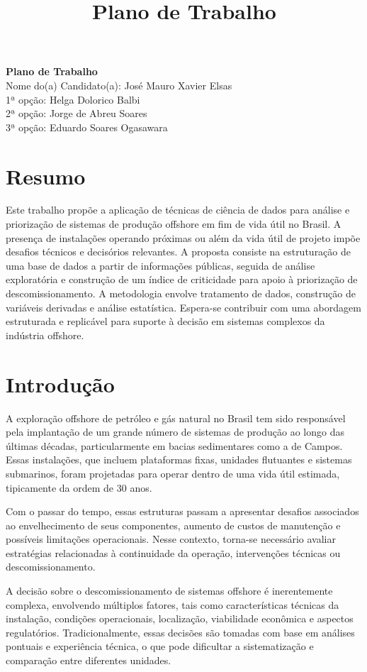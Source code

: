 \documentclass[a4paper,12pt]{article}
\title{Plano de Trabalho}
\author{}
\date{}
\begin{document}
\begin{center}
{\Large \textbf{Plano de Trabalho}}\\[1em]
Nome do(a) Candidato(a): José Mauro Xavier Elsas\\
1ª opção: Helga Dolorico Balbi\\
2ª opção: Jorge de Abreu Soares\\
3ª opção: Eduardo Soares Ogasawara
\end{center}

\section*{Resumo}

Este trabalho propõe a aplicação de técnicas de ciência de dados para análise e priorização de sistemas de produção offshore em fim de vida útil no Brasil. A presença de instalações operando próximas ou além da vida útil de projeto impõe desafios técnicos e decisórios relevantes. A proposta consiste na estruturação de uma base de dados a partir de informações públicas, seguida de análise exploratória e construção de um índice de criticidade para apoio à priorização de descomissionamento. A metodologia envolve tratamento de dados, construção de variáveis derivadas e análise estatística. Espera-se contribuir com uma abordagem estruturada e replicável para suporte à decisão em sistemas complexos da indústria offshore.

\section{Introdução}

A exploração offshore de petróleo e gás natural no Brasil tem sido responsável pela implantação de um grande número de sistemas de produção ao longo das últimas décadas, particularmente em bacias sedimentares como a de Campos. Essas instalações, que incluem plataformas fixas, unidades flutuantes e sistemas submarinos, foram projetadas para operar dentro de uma vida útil estimada, tipicamente da ordem de 30 anos.

Com o passar do tempo, essas estruturas passam a apresentar desafios associados ao envelhecimento de seus componentes, aumento de custos de manutenção e possíveis limitações operacionais. Nesse contexto, torna-se necessário avaliar estratégias relacionadas à continuidade da operação, intervenções técnicas ou descomissionamento.

A decisão sobre o descomissionamento de sistemas offshore é inerentemente complexa, envolvendo múltiplos fatores, tais como características técnicas da instalação, condições operacionais, localização, viabilidade econômica e aspectos regulatórios. Tradicionalmente, essas decisões são tomadas com base em análises pontuais e experiência técnica, o que pode dificultar a sistematização e comparação entre diferentes unidades.
\end{document}
